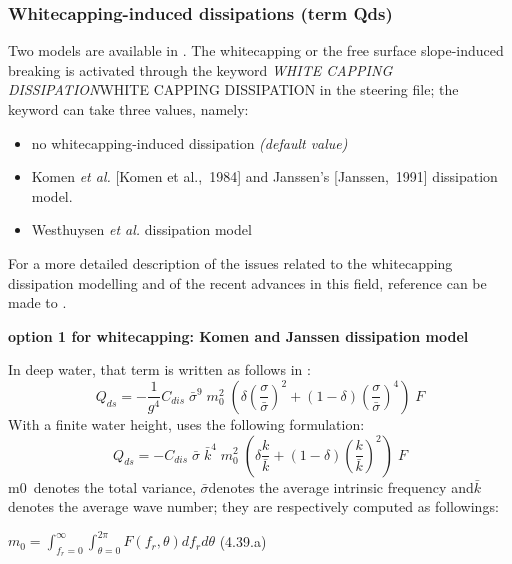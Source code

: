 \subsubsection{ Whitecapping-induced dissipations (term Qds)}

 Two models are available in \tomawac. The whitecapping or the free surface slope-induced breaking is activated through the keyword \textit{WHITE CAPPING DISSIPATION}WHITE CAPPING DISSIPATION\textit{ }in the steering file; the keyword can take three values, namely:

\begin{itemize}
\item  no whitecapping-induced dissipation \textit{(default value)}

\item  Komen \textit{et al.} [Komen et al.,~1984] and Janssen's [Janssen,~1991] dissipation model.

\item  Westhuysen \textit{et al.} dissipation model \cite{Westhuys2007}
\end{itemize}

 For a more detailed description of the issues related to the whitecapping dissipation modelling and of the recent advances in this field, reference can be made to \cite{Wise2007}.


{\bf  option 1 for whitecapping: Komen and Janssen dissipation model}

In deep water, that term is written as follows in \tomawac:
\begin{equation} \label{GrindEQ__4_37_}
Q_{ds} =-\frac{1}{g^{4} } C_{dis} \; \bar{\sigma }^{9} \; m_{0}^{2} \; \left(\delta \left(\frac{\sigma }{\bar{\sigma }} \right)^{2} +(1-\delta )\left(\frac{\sigma }{\bar{\sigma }} \right)^{4} \right)\; F
\end{equation}
With a finite water height, \tomawac uses the following formulation:
\begin{equation} \label{GrindEQ__4_38_}
Q_{ds} =-C_{dis} \; \bar{\sigma }\; \bar{k}^{4} \; m_{0}^{2} \; \left(\delta \frac{k}{\bar{k}} +(1-\delta )\left(\frac{k}{\bar{k}} \right)^{2} \right)\; F
\end{equation}
m0~denotes the total variance, $\bar{\sigma }$denotes the average intrinsic frequency and$\bar{k}$ denotes the average wave number; they are respectively computed as followings:

$m_{0} =\int _{f_{r} =0}^{\infty }\int _{\theta =0}^{2\pi }  F(f_{r} ,\theta )df_{r} d\theta $ (4.39.a)

